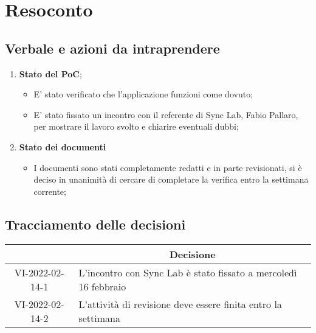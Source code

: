 \section{Resoconto}
\subsection{Verbale e azioni da intraprendere}

\begin{enumerate}
	\item \textbf{Stato del PoC};
	\begin{itemize}
		\item E' stato verificato che l'applicazione funzioni come dovuto;
		\item E' stato fissato un incontro con il referente di Sync Lab, Fabio Pallaro, per mostrare il lavoro svolto e chiarire eventuali dubbi;
	\end{itemize}
	\item \textbf{Stato dei documenti}
	\begin{itemize}
		\item I documenti sono stati completamente redatti e in parte revisionati, si è deciso in unanimità di cercare di completare la verifica entro la settimana corrente;
	\end{itemize}
\end{enumerate}

\pagebreak

\subsection{Tracciamento delle decisioni}

\begin{table}[H]
	\centering
	\renewcommand{\arraystretch}{1.8}
	\begin{tabular}{c | p{10cm}}
		\rowcolor[HTML]{125E28}
		\multicolumn{1}{c}{\color[HTML]{FFFFFF} \textbf{ID}} &
		\multicolumn{1}{c}{\color[HTML]{FFFFFF} \textbf{Decisione}} \\
		\hline
		VI-2022-02-14-1 & L'incontro con Sync Lab è stato fissato a mercoledì 16 febbraio \\ \hline
		VI-2022-02-14-2 & L'attività di revisione deve essere finita entro la settimana \\
	\end{tabular}
\end{table}